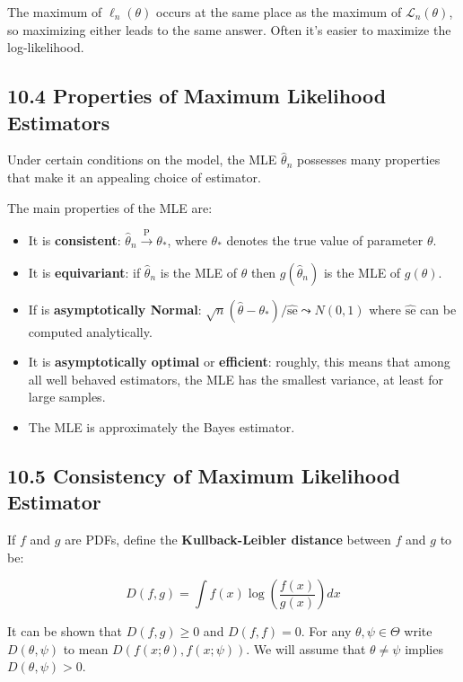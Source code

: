 The maximum of \(\ell_n(\theta)\) occurs at the same place as the
maximum of \(\mathcal{L}_n(\theta)\), so maximizing either leads to the
same answer. Often it's easier to maximize the log-likelihood.

\subsection{10.4 Properties of Maximum Likelihood
Estimators}\label{properties-of-maximum-likelihood-estimators}

Under certain conditions on the model, the MLE \(\hat{\theta}_n\)
possesses many properties that make it an appealing choice of estimator.

The main properties of the MLE are:

\begin{itemize}[tightlist]
\item
  It is \textbf{consistent}:
  \(\hat{\theta}_n \xrightarrow{\text{P}} \theta_*\), where \(\theta_*\)
  denotes the true value of parameter \(\theta\).
\item
  It is \textbf{equivariant}: if \(\hat{\theta}_n\) is the MLE of
  \(\theta\) then \(g(\hat{\theta}_n)\) is the MLE of \(g(\theta)\).
\item
  If is \textbf{asymptotically Normal}:
  \(\sqrt{n}(\hat{\theta} - \theta_*) / \hat{\text{se}} \leadsto N(0, 1)\)
  where \(\hat{\text{se}}\) can be computed analytically.
\item
  It is \textbf{asymptotically optimal} or \textbf{efficient}: roughly,
  this means that among all well behaved estimators, the MLE has the
  smallest variance, at least for large samples.
\item
  The MLE is approximately the Bayes estimator.
\end{itemize}

\subsection{10.5 Consistency of Maximum Likelihood
Estimator}\label{consistency-of-maximum-likelihood-estimator}

If \(f\) and \(g\) are PDFs, define the \textbf{Kullback-Leibler
distance} between \(f\) and \(g\) to be:

\[ D(f, g) = \int f(x) \log \left( \frac{f(x)}{g(x)} \right) dx \]

It can be shown that \(D(f, g) \geq 0\) and \(D(f, f) = 0\). For any
\(\theta, \psi \in \Theta\) write \(D(\theta, \psi)\) to mean
\(D(f(x; \theta), f(x; \psi))\). We will assume that
\(\theta \neq \psi\) implies \(D(\theta, \psi) > 0\).

